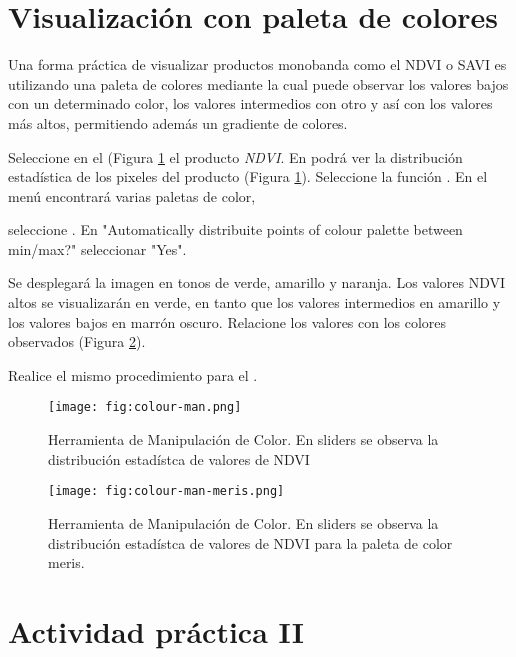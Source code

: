 \section{Visualización con paleta de colores}

Una forma práctica de visualizar productos monobanda como el NDVI o SAVI es utilizando una paleta de colores mediante la cual puede observar los valores bajos con un determinado color, los valores intermedios con otro y así con los valores más altos, permitiendo además un gradiente de colores. %

Seleccione en el  (Figura \ref{fig:color-man} el producto \emph{NDVI}. En  podrá ver la distribución estadística de los pixeles del producto (Figura \ref{fig:color-man}). Seleccione la función . En el menú encontrará varias paletas de color, 

seleccione  . En "Automatically distribuite points of colour palette between min/max?" seleccionar "Yes".

Se desplegará la imagen en tonos de verde, amarillo y naranja. Los valores NDVI altos se visualizarán en verde, en tanto que los valores intermedios en amarillo y los valores bajos en marrón oscuro. Relacione los valores con los colores observados (Figura \ref{fig:color-man-meris}).

Realice el mismo procedimiento para el .

\begin{figure}[h!]
    \centering
    \texttt{[image: fig:colour-man.png]}
    \caption{Herramienta de Manipulación de Color. En sliders se observa la distribución estadístca de valores de NDVI}
    \label{fig:color-man}
\end{figure}

\begin{figure}[h!]
    \centering
    \texttt{[image: fig:colour-man-meris.png]}
    \caption{Herramienta de Manipulación de Color. En sliders se observa la distribución estadístca de valores de NDVI para la paleta de color meris.}
    \label{fig:color-man-meris}
\end{figure}



\section{Actividad práctica II}


